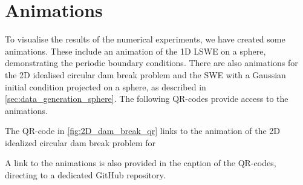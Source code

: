 \section{Animations}\label{sec:animations}
To visualise the results of the numerical experiments, we have created some animations.
These include an animation of the 1D LSWE on a sphere, demonstrating the periodic boundary conditions.
There are also animations for the 2D idealised circular dam break problem and the SWE with a Gaussian initial condition projected on a sphere, as described in \autoref{sec:data_generation_sphere}.
The following QR-codes provide access to the animations.

The QR-code in \autoref{fig:2D_dam_break_qr} links to the animation of the 2D idealized circular dam break problem for 

A link to the animations is also provided in the caption of the QR-codes, directing to a dedicated GitHub repository.

